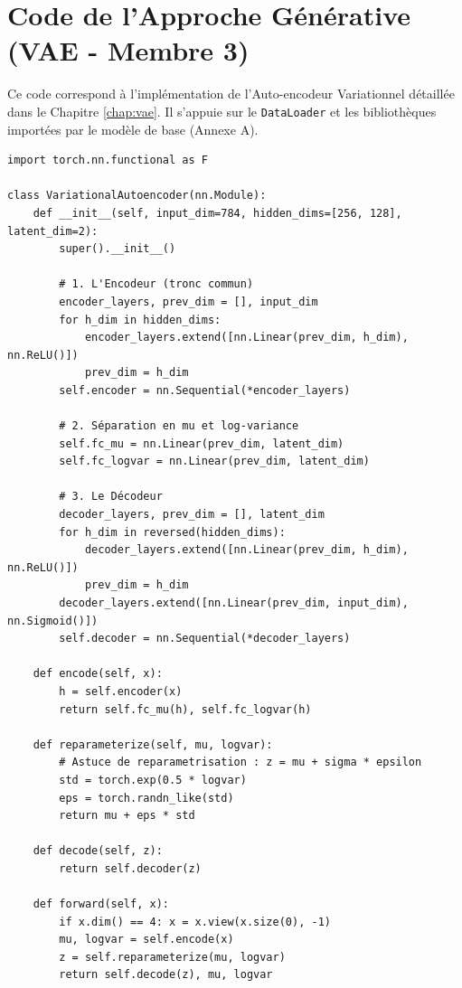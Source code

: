 \documentclass[11pt,a4paper]{report}
\begin{document}
\chapter{Code de l'Approche Générative (VAE - Membre 3)}
\label{annexe:code_vae}

Ce code correspond à l'implémentation de l'Auto-encodeur Variationnel détaillée dans le Chapitre \ref{chap:vae}. Il s'appuie sur le \texttt{DataLoader} et les bibliothèques importées par le modèle de base (Annexe A).

\begin{lstlisting}[caption=Architecture du Variational Autoencoder et Reparamétrisation]
import torch.nn.functional as F

class VariationalAutoencoder(nn.Module):
    def __init__(self, input_dim=784, hidden_dims=[256, 128], latent_dim=2):
        super().__init__()
        
        # 1. L'Encodeur (tronc commun)
        encoder_layers, prev_dim = [], input_dim
        for h_dim in hidden_dims:
            encoder_layers.extend([nn.Linear(prev_dim, h_dim), nn.ReLU()])
            prev_dim = h_dim
        self.encoder = nn.Sequential(*encoder_layers)
        
        # 2. Séparation en mu et log-variance
        self.fc_mu = nn.Linear(prev_dim, latent_dim)
        self.fc_logvar = nn.Linear(prev_dim, latent_dim)
        
        # 3. Le Décodeur
        decoder_layers, prev_dim = [], latent_dim
        for h_dim in reversed(hidden_dims):
            decoder_layers.extend([nn.Linear(prev_dim, h_dim), nn.ReLU()])
            prev_dim = h_dim
        decoder_layers.extend([nn.Linear(prev_dim, input_dim), nn.Sigmoid()])
        self.decoder = nn.Sequential(*decoder_layers)

    def encode(self, x):
        h = self.encoder(x)
        return self.fc_mu(h), self.fc_logvar(h)

    def reparameterize(self, mu, logvar):
        # Astuce de reparametrisation : z = mu + sigma * epsilon
        std = torch.exp(0.5 * logvar)
        eps = torch.randn_like(std)
        return mu + eps * std

    def decode(self, z):
        return self.decoder(z)

    def forward(self, x):
        if x.dim() == 4: x = x.view(x.size(0), -1)
        mu, logvar = self.encode(x)
        z = self.reparameterize(mu, logvar)
        return self.decode(z), mu, logvar
\end{lstlisting}
\end{document}
